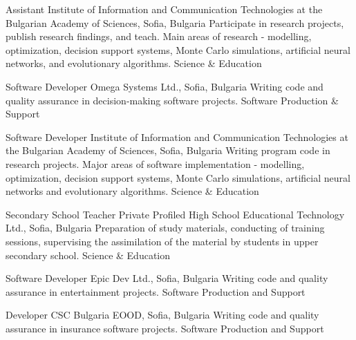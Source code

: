 \documentclass[english,a4paper]{europasscv}
\begin{document}
  \begin{europasscv}

  \ecvpersonalinfo


  
   {Assistant}
  \ecvitem {} {Institute of Information and Communication Technologies at the Bulgarian Academy of Sciences, Sofia, Bulgaria}
  \ecvitem {} {Participate in research projects, publish research findings, and teach. Main areas of research - modelling, optimization, decision support systems, Monte Carlo simulations, artificial neural networks, and evolutionary algorithms.}
  \ecvitem {} { \quad Science \& Education}
  
   {Software Developer}
  \ecvitem {} {Omega Systems Ltd., Sofia, Bulgaria}
  \ecvitem {} {Writing code and quality assurance in decision-making software projects.}
  \ecvitem {} { \quad Software Production \& Support}
  
   {Software Developer}
  \ecvitem {} {Institute of Information and Communication Technologies at the Bulgarian Academy of Sciences, Sofia, Bulgaria}
  \ecvitem {} {Writing program code in research projects. Major areas of software implementation - modelling, optimization, decision support systems, Monte Carlo simulations, artificial neural networks and evolutionary algorithms.}
  \ecvitem {} { \quad Science \& Education}
  
   {Secondary School Teacher}
  \ecvitem {} {Private Profiled High School Educational Technology Ltd., Sofia, Bulgaria}
  \ecvitem {} {Preparation of study materials, conducting of training sessions, supervising the assimilation of the material by students in upper secondary school.}
  \ecvitem {} { \quad Science \& Education}
  
   {Software Developer}
  \ecvitem {} {Epic Dev Ltd., Sofia, Bulgaria}
  \ecvitem {} {Writing code and quality assurance in entertainment projects.}
  \ecvitem {} { \quad Software Production and Support}
  
   {Developer}
  \ecvitem {} {CSC Bulgaria EOOD, Sofia, Bulgaria}
  \ecvitem {} {Writing code and quality assurance in insurance software projects.}
  \ecvitem {} { \quad Software Production and Support}
  

\end{europasscv}
\end{document}
